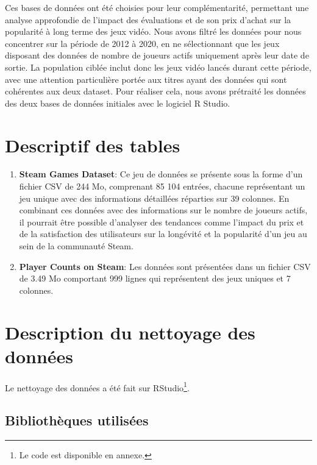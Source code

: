 \documentclass[mstat,12pt]{unswthesis}
\begin{document}
\medskip

Ces bases de données ont été choisies pour leur complémentarité,
permettant une analyse approfondie de l'impact des évaluations et de son
prix d'achat sur la popularité à long terme des jeux vidéo. Nous avons
filtré les données pour nous concentrer sur la période de 2012 à 2020,
en ne sélectionnant que les jeux disposant des données de nombre de
joueurs actifs uniquement après leur date de sortie. La population
ciblée inclut donc les jeux vidéo lancés durant cette période, avec une
attention particulière portée aux titres ayant des données qui sont
cohérentes aux deux dataset. Pour réaliser cela, nous avons prétraité
les données des deux bases de données initiales avec le logiciel R
Studio.

\newpage

\hypertarget{descriptif-des-tables}{%
\section{Descriptif des tables}\label{descriptif-des-tables}}

\begin{enumerate}

\item\textbf{Steam Games Dataset}:
Ce jeu de données se présente sous la forme d'un fichier CSV de 244 Mo, comprenant 85 104 entrées, chacune représentant un jeu unique avec des informations détaillées réparties sur 39 colonnes. En combinant ces données avec des informations sur le nombre de joueurs actifs, il pourrait être possible d'analyser des tendances comme l'impact du prix et de la satisfaction des utilisateurs sur la longévité et la popularité d'un jeu au sein de la communauté Steam.
\smallskip
\item\textbf{Player Counts on Steam}: Les données sont présentées dans un fichier CSV de 3.49 Mo comportant 999 lignes qui représentent des jeux uniques et 7 colonnes.
\end{enumerate}

\hypertarget{description-du-nettoyage-des-donnuxe9es}{%
\section{Description du nettoyage des
données}\label{description-du-nettoyage-des-donnuxe9es}}

Le nettoyage des données a été fait sur RStudio\footnote{Le code est
  disponible en annexe.}.

\hypertarget{bibliothuxe8ques-utilisuxe9es}{%
\subsection{Bibliothèques
utilisées}\label{bibliothuxe8ques-utilisuxe9es}}
\end{document}

